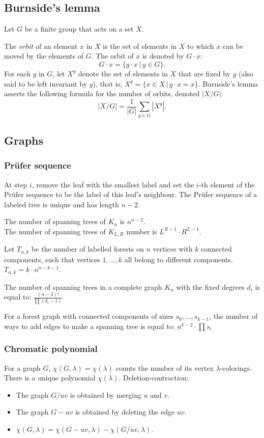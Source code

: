 \vspace{7pt}

\subsection{Burnside's lemma}

Let $G$ be a finite group that acts on a set $X$.

The \textit{orbit} of an element $x$ in $X$ is the set of elements
in $X$ to which $x$ can be moved by the elements of $G$.
The orbit of $x$ is denoted by $G \cdot x$:
 $$G \cdot x = \{g \cdot x\, |\, g \in G\}.$$
For each $g$ in $G$, let $X^g$ denote the set of elements
in $X$ that are fixed by $g$ (also said to be left invariant by $g$),
that is, $X^g = \{ x \in X\, |\, g \cdot x = x \}$.
Burnside's lemma asserts the following formula for the number of orbits,
denoted $|X/G|$:
$$|X/G| = \frac{1}{|G|} \sum_{g \in G} |X^g|.$$

\subsection{Graphs}

\subsubsection{Prüfer sequence}
At step $i$, remove the leaf with the smallest label and set the $i$-th 
element of the Prüfer sequence to be the label of this leaf's neighbour.
The Prüfer sequence of a labeled tree is unique and has length $n - 2$.

The number of spanning trees of $K_n$ is $n^{n - 2}$.\\
The number of spanning trees of $K_{L, R}$ number is $L^{R - 1} \cdot R^{L - 1}$.

Let $T_{n, k}$ be the number of labelled forests on $n$ vertices with $k$ connected components, 
such that vertices $1, \dots, k$ all belong to different components. 
$T_{n,k} = k \cdot n^{n - k - 1}$.

The number of spanning trees in a complete graph $K_{n}$ with the fixed degrees
$d_{i}$ is equal to:
$ \frac{(n - 2)!}{\prod(d_i - 1)} $

For a forest graph with connected components of sizes $s_0, \dots, s_{k - 1}$, 
the number of ways to add edges to make a spanning tree is equal to:
$ n^{k - 2} \cdot \prod s_i$

\subsubsection{Chromatic polynomial}
For a graph $G$, $\chi(G, \lambda) = \chi(\lambda)$ counts the number of its vertex $\lambda$-colorings.
There is a unique polynomial $\chi(\lambda)$. Deletion-contraction:
\begin{itemize}
\item The graph $G/uv$ is obtained by merging $u$ and $v$.
\item The graph $G - uv$ is obtained by deleting the edge $uv$.
\item $\chi(G, \lambda) = \chi(G - uv, \lambda) - \chi(G/uv, \lambda)$. 
\end{itemize}

